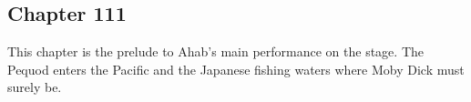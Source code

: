 \subsection{Chapter 111}

This chapter is the prelude to Ahab's main performance on the stage. The Pequod
enters the Pacific and the Japanese fishing waters where Moby Dick must surely
be.
